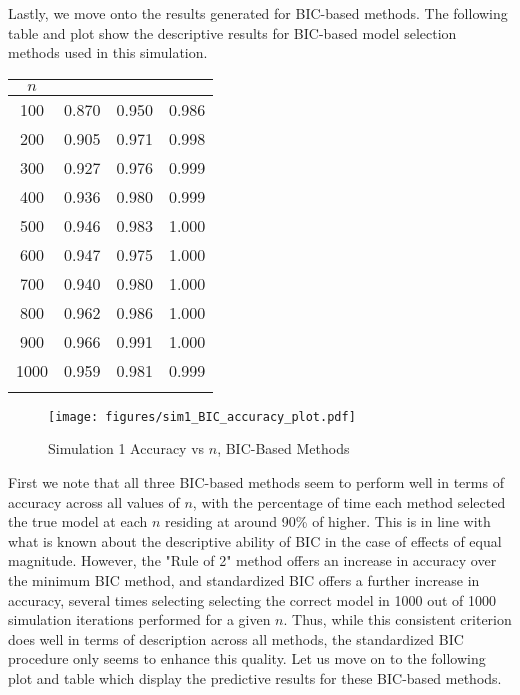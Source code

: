 		Lastly, we move onto the results generated for BIC-based methods. The following table and plot show the descriptive results for BIC-based model selection methods used
		in this simulation.

		\begin{table}[H]
			\centering
			\small\addtolength{\tabcolsep}{-3pt}
			\setlength\extrarowheight{-3pt}
			{
			\begin{tabular}{ c|c|c|c}
			$n$ & \vtop{\hbox{\strut Minimum BIC}\hbox{\strut Accuracy}} & \vtop{\hbox{\strut BIC Rule of 2}\hbox{\strut Accuracy}} & \vtop{\hbox{\strut Standardized BIC} \hbox{\strut Accuracy}} \\
			 \hline
			 100 & 0.870 & 0.950 & 0.986 \\
			 200 & 0.905 & 0.971 & 0.998 \\
			 300 & 0.927 & 0.976 & 0.999 \\
			 400 & 0.936 & 0.980 & 0.999 \\
			 500 & 0.946 & 0.983 & 1.000 \\
			 600 & 0.947 & 0.975 & 1.000 \\
			 700 & 0.940 & 0.980 & 1.000 \\
			 800 & 0.962 & 0.986 & 1.000 \\
			 900 & 0.966 & 0.991 & 1.000 \\
			1000 & 0.959 & 0.981 & 0.999 \\
			 \Xhline{3\arrayrulewidth}
			\end{tabular}
			}
		\end{table}

		\begin{figure}[H]
			\centering
			\captionsetup{justification=centering}
			\texttt{[image: figures/sim1\_BIC\_accuracy\_plot.pdf]}
			\caption{\label{fig:sim1_bic_accuracy_plot} Simulation 1 Accuracy vs $n$, BIC-Based Methods}
		\end{figure}

		First we note that all three BIC-based methods seem to perform well in terms of accuracy across all values of $n$, with the percentage of time each method selected the true model
		at each $n$ residing at around 90\% of higher. This is in line with what is known about the descriptive ability of BIC in the case of effects of equal magnitude. However, the
		"Rule of 2" method offers an increase in accuracy over the minimum BIC method, and standardized BIC offers a further increase in accuracy, several times selecting selecting the
		correct model in 1000 out of 1000 simulation iterations performed for a given $n$. Thus, while this consistent criterion does well in terms of description across all methods, the
		standardized BIC procedure only seems to enhance this quality. Let us move on to the following plot and table which display the predictive results for these BIC-based methods.


